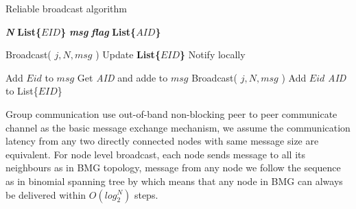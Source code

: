 \documentclass[sigconf]{acmart}
\begin{document}
\begin{algorithm}
\caption{Reliable broadcast algorithm }
\textbf{\textit{N}} \newline
\textbf{List\{$EID$\}} \newline
\textbf{\textit{msg}} \newline
\textbf{\textit{flag}} \newline
\textbf{List\{$AID$\}} \newline

\begin{algorithmic}[1]
\EndFor
\EndProcedure
\end{algorithmic}

\begin{algorithmic}[1]
    \State Broadcast( $j, N, msg$ )
    \State Update \textbf{List\{$EID$\}}
    \State Notify locally
\EndIf
\EndProcedure
\end{algorithmic}

\begin{algorithmic}[1]
    \State Add $Eid$ to $msg$
    \State Get \textit{AID} and adde to $msg$
    \State Broadcast( $j, N, msg$ )
    \State Add $Eid$ \textit{AID} to List\{$EID$\}
\EndIf
\EndProcedure
\end{algorithmic}

\end{algorithm}

Group communication use out-of-band non-blocking peer to peer communicate channel as the basic message exchange mechanism, we assume the communication latency from any two directly connected nodes with same message size are equivalent. For node level broadcast, each node sends message to all its neighbours  as in BMG topology, message from any node we follow the sequence as in binomial spanning tree by which means that any node in BMG can always be delivered within $O(log_2^N)$ steps.
\end{document}
